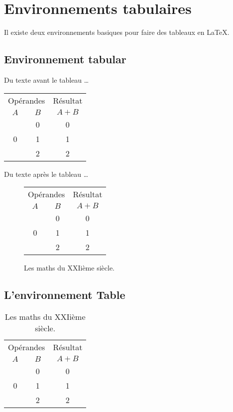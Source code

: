 \chapter{Environnements tabulaires}

Il existe deux environnements basiques pour faire des tableaux en \LaTeX.


\section{Environnement tabular}

Du texte avant le tableau \ldots

\begin{tabular}{ccc} %
\hline
\multicolumn{2}{c}{Opérandes} & Résultat \\
$A$ & $B$ & $A+B$ \\
\multirow{3}{*}{0} & 0 & 0 \\
 & 1 & 1 \\
 & 2 & 2 \\
\hline
\end{tabular}

Du texte après le tableau \ldots

\begin{figure}
\begin{center}
\begin{tabular}{ccc} %
\hline
\multicolumn{2}{c}{Opérandes} & Résultat \\
$A$ & $B$ & $A+B$ \\
\multirow{3}{*}{0} & 0 & 0 \\
 & 1 & 1 \\
 & 2 & 2 \\
\hline
\end{tabular}
\end{center}
\caption{Les maths du XXIième siècle.}
\label{tab:maths}
\end{figure}

\section{L'environnement Table}


\begin{table}
\begin{center}
\begin{tabular}{ccc} %
\hline
\multicolumn{2}{c}{Opérandes} & Résultat \\
$A$ & $B$ & $A+B$ \\
\multirow{3}{*}{0} & 0 & 0 \\
 & 1 & 1 \\
 & 2 & 2 \\
\hline
\end{tabular}
\end{center}
\caption{Les maths du XXIième siècle.}
\label{tab:maths}
\end{table}

